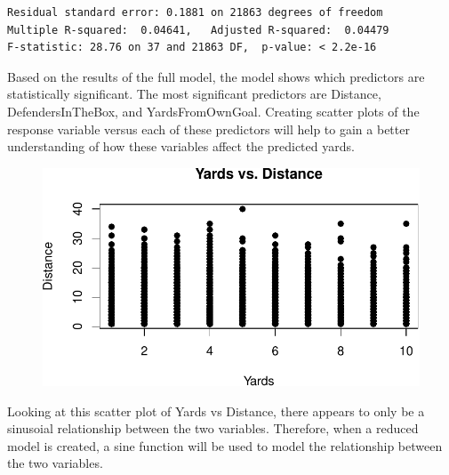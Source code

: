 \documentclass[
  super,
  preprint,
  3p]{elsarticle}
\newenvironment{Shaded}{\begin{snugshade}}{\end{snugshade}}
\newcommand{\AttributeTok}[1]{\textcolor[rgb]{0.40,0.45,0.13}{#1}}
\newcommand{\CommentTok}[1]{\textcolor[rgb]{0.37,0.37,0.37}{#1}}
\newcommand{\DecValTok}[1]{\textcolor[rgb]{0.68,0.00,0.00}{#1}}
\newcommand{\FunctionTok}[1]{\textcolor[rgb]{0.28,0.35,0.67}{#1}}
\newcommand{\NormalTok}[1]{\textcolor[rgb]{0.00,0.23,0.31}{#1}}
\newcommand{\SpecialCharTok}[1]{\textcolor[rgb]{0.37,0.37,0.37}{#1}}
\newcommand{\StringTok}[1]{\textcolor[rgb]{0.13,0.47,0.30}{#1}}
\begin{document}
\begin{verbatim}
Residual standard error: 0.1881 on 21863 degrees of freedom
Multiple R-squared:  0.04641,   Adjusted R-squared:  0.04479 
F-statistic: 28.76 on 37 and 21863 DF,  p-value: < 2.2e-16
\end{verbatim}

Based on the results of the full model, the model shows which predictors
are statistically significant. The most significant predictors are
Distance, DefendersInTheBox, and YardsFromOwnGoal. Creating scatter
plots of the response variable versus each of these predictors will help
to gain a better understanding of how these variables affect the
predicted yards.

\begin{Shaded}
\end{Shaded}

\begin{figure}[H]

{\centering \includegraphics{project_report_files/figure-pdf/unnamed-chunk-28-1.pdf}

}

\end{figure}

Looking at this scatter plot of Yards vs Distance, there appears to only
be a sinusoial relationship between the two variables. Therefore, when a
reduced model is created, a sine function will be used to model the
relationship between the two variables.
\end{document}
